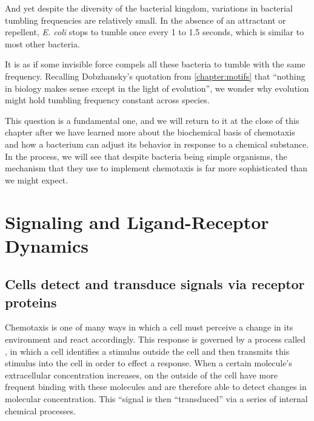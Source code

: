 And yet despite the diversity of the bacterial kingdom, variations in bacterial tumbling frequencies are relatively small. In the absence of an attractant or repellent, \textit{E. coli} stops to tumble once every 1 to 1.5 seconds, which is similar to most other bacteria.

It is as if some invisible force compels all these bacteria to tumble with the same frequency. Recalling Dobzhansky's quotation from \autoref{chapter:motifs} that ``nothing in biology makes sense except in the light of evolution'', we wonder why evolution might hold tumbling frequency constant across species.

This question is a fundamental one, and we will return to it at the close of this chapter after we have learned more about the biochemical basis of chemotaxis and how a bacterium can adjust its behavior in response to a chemical substance. In the process, we will see that despite bacteria being simple organisms, the mechanism that they use to implement chemotaxis is far more sophisticated than we might expect.\\


\FloatBarrier
{}
\section{Signaling and Ligand-Receptor Dynamics}
\label{sec:signal}

\subsection{Cells detect and transduce signals via receptor proteins}

Chemotaxis is one of many ways in which a cell must perceive a change in its environment and react accordingly. This response is governed by a process called , in which a cell identifies a stimulus outside the cell and then transmits this stimulus into the cell in order to effect a response. When a certain molecule's extracellular concentration increases,  on the outside of the cell have more frequent binding with these molecules and are therefore able to detect changes in molecular concentration. This ``signal is then ``transduced'' via a series of internal chemical processes.

